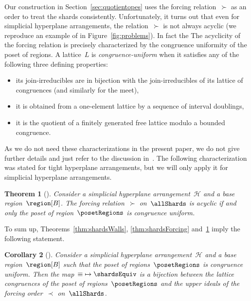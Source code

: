 \documentclass{amsart}
\newtheorem{theorem}{Theorem}%
\newtheorem{corollary}[theorem]{Corollary}
\theoremstyle{definition}
\newcommand{\fref}[1]{Figure~\ref{#1}} %
\newcommand{\darkblue}{\color{darkblue}} %
\newcommand{\defn}[1]{\textsl{\darkblue #1}} %
\newcommand{\arrangement}{\mathcal{H}} %
\begin{document}
Our construction in Section~\ref{sec:quotientopes} uses the  forcing relation~$\succ$ as an order to treat the shards consistently.
Unfortunately, it turns out that even for simplicial hyperplane arrangements, the relation~$\succ$ is not always acyclic (we reproduce an example of \cite{Reading-PosetRegionsChapter} in \fref{fig:problems}).
In fact the 
The acyclicity of the forcing relation is precisely characterized by the congruence uniformity of the poset of regions.
A lattice~$L$ is \defn{congruence-uniform} when it satisfies any of the following three defining properties:
\begin{itemize}
\item its join-irreducibles are in bijection with the join-irreducibles of its lattice of congruences (and similarly for the meet),
\item it is obtained from a one-element lattice by a sequence of interval doublings,
\item it is the quotient of a finitely generated free lattice modulo a bounded congruence.
\end{itemize}
As we do not need these characterizations in the present paper, we do not give further details and just refer to the discussion in~\cite[Thm.~5.19]{Reading-PosetRegionsChapter}.
The following characterization was stated for tight hyperplane arrangements, but we will only apply it for simplicial hyperplane arrangements.

\begin{theorem}[{\cite[Sect.~8.1]{Reading-PosetRegionsChapter}}]
\label{thm:forcingAcyclic}
Consider a simplicial hyperplane arrangement~$\arrangement$ and a base region~$\region[B]$.
The forcing relation~$\succ$ on~$\allShards$ is acyclic if and only the poset of region~$\posetRegions$ is congruence uniform.
\end{theorem}

To sum up, Theorems~\ref{thm:shardsWalls}, \ref{thm:shardsForcing} and~\ref{thm:forcingAcyclic} imply the following statement.

\begin{corollary}[{\cite[Sect.~8.1]{Reading-PosetRegionsChapter}}]
Consider a simplicial hyperplane arrangement~$\arrangement$ and a base region~$\region[B]$ such that the poset of regions~$\posetRegions$ is congruence uniform.
Then the map~${\equiv} \mapsto \shardsEquiv$ is a bijection between the lattice congruences of the poset of regions~$\posetRegions$ and the upper ideals of the forcing order~$\prec$ on~$\allShards$.
\end{corollary}
\end{document}
